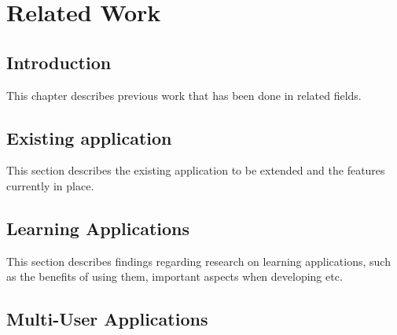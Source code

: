 
\chapter{Related Work}

\label{Chapter2}



\section{Introduction}

This chapter describes previous work that has been done in related fields.


\section{Existing application}

This section describes the existing application to be extended and the features currently in place.


\section{Learning Applications}

This section describes findings regarding research on learning applications, such as the benefits of using them, important aspects when developing etc.


\section{Multi-User Applications}

